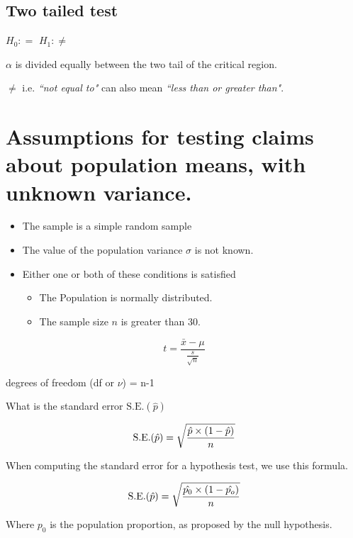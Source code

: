\documentclass[]{report}
\begin{document}
{
\subsection{Two tailed test}

$H_0:  = $
$H_1:  \neq $

$\alpha$ is divided equally between the two tail of the critical region.

$\neq$ i.e. \emph{``not equal to"} can also mean \emph{``less than or greater than"}.
}

\section{Assumptions for testing claims about population means, with unknown variance.}
{
\begin{itemize}
\item The sample is a simple random sample
\item The value of the population variance $\sigma$ is not known.
\item Either one or both of these conditions is satisfied
\begin{itemize}
\item The Population is normally distributed.
\item The sample size $n$ is greater than 30.
\end{itemize}
\end{itemize}
}

{
\[ t = \frac{\bar{x} - \mu}{\frac{s}{\sqrt{n}}} \]

degrees of freedom (df or $\nu$) = n-1
}












{
What is the standard error $\mbox{S.E.}(\hat{p})$ 

\[ \mbox{S.E.}(\hat{p}) = \sqrt{{\hat{p} \times (1- \hat{p}) \over n}} \]

When computing the standard error for a hypothesis test, we use this formula.

\[ \mbox{S.E.}(\hat{p}) = \sqrt{{\hat{p_0} \times (1- \hat{p_o}) \over n}} \]

Where $p_0$ is the population proportion, as proposed by the null hypothesis.
}
\end{document}
